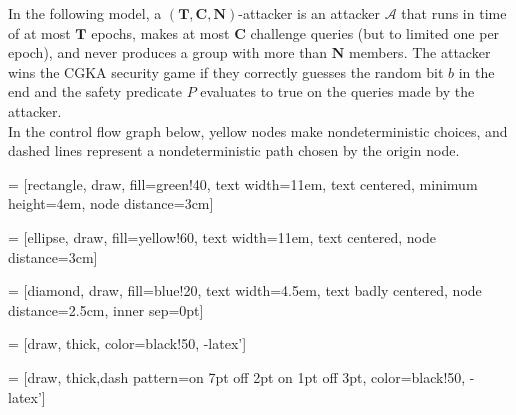 \documentclass{article}
\title{}
\author{}
\renewenvironment{abstract}
{\small
	\begin{center}
		\bfseries \abstractname\vspace{-.5em}\vspace{0pt}
	\end{center}
	\list{}{%
		\setlength{\leftmargin}{5cm}
		\setlength{\rightmargin}{\leftmargin}%
	}%
	\item\relax}
{\endlist}
\begin{document}
\vspace*{1cm}

\begin{abstract}
In the following model, a $( \textbf{T}, \textbf{C}, \textbf{N} )$-attacker is an attacker $\mathcal{A}$ that runs in time of at most $\textbf{T}$ epochs, makes at most $\textbf{C}$ challenge queries (but to limited one per epoch), and never produces a group with more than $\textbf{N}$ members.
The attacker wins the CGKA security game if they correctly guesses the random bit $b$ in the end and the safety predicate $P$ evaluates to true on the queries made by the attacker.\\

In the control flow graph below, yellow nodes make nondeterministic choices, and dashed lines represent a nondeterministic path chosen by the origin node.
\end{abstract}

\vspace*{1cm}

 = [rectangle, draw, fill=green!40, text width=11em, text centered, minimum height=4em, node distance=3cm]

 = [ellipse, draw, fill=yellow!60, text width=11em, text centered, node distance=3cm]

 = [diamond, draw, fill=blue!20, text width=4.5em, text badly centered, node distance=2.5cm, inner sep=0pt]

 = [draw, thick, color=black!50, -latex']

 = [draw, thick,dash pattern={on 7pt off 2pt on 1pt off 3pt}, color=black!50, -latex']
\end{document}
